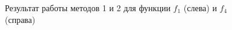 \documentclass[a4paper]{article}
\begin{document}
\begin{figure}[!h]
\begin{minipage}[h]{0.49\linewidth}
  \end{minipage}
  \caption{Результат работы методов 1 и 2 для функции $f_1$ (слева) и $f_4$ (справа)}
  \label{r1}
\end{figure}
\end{document}
